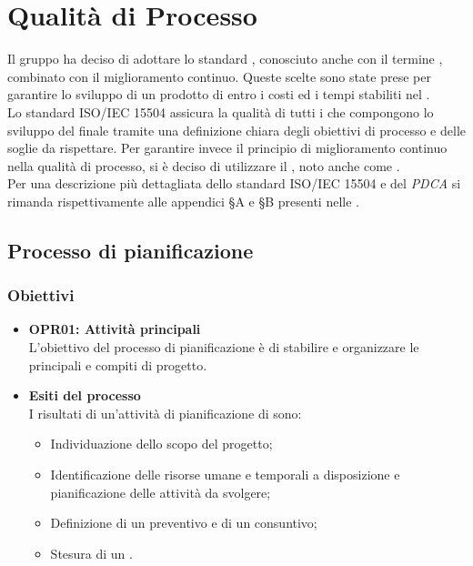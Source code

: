 \section{Qualità di Processo}
\label{qualità_processo}
Il gruppo {\Gruppo} ha deciso di adottare lo standard , conosciuto anche con il termine , combinato con il miglioramento continuo. Queste scelte sono state prese per garantire lo sviluppo di un prodotto di  entro i costi ed i tempi stabiliti nel \textit{\PdP}. \\
Lo standard ISO/IEC 15504 assicura la qualità di tutti i  che compongono lo sviluppo del  finale tramite una definizione chiara degli obiettivi di processo e delle soglie da rispettare. Per garantire invece il principio di miglioramento continuo nella qualità di processo, si è deciso di utilizzare il , noto anche come . \\
Per una descrizione più dettagliata dello standard ISO/IEC 15504 e del \textit{PDCA} si rimanda rispettivamente alle appendici \S{A} e \S{B} presenti nelle \textit{}.

\subsection{Processo di pianificazione}

\subsubsection{Obiettivi}
\begin{itemize}
	\item \textbf{OPR01: Attività principali}\\
	L'obiettivo del processo di pianificazione è di stabilire e organizzare le principali  e compiti di progetto.
	\item \textbf{Esiti del processo}\\
	I risultati di un'attività di pianificazione di  sono:
	\begin{itemize}
		\item Individuazione dello scopo del progetto;
		\item Identificazione delle risorse umane e temporali a disposizione e pianificazione delle attività da svolgere;
		\item Definizione di un preventivo e di un consuntivo;
		\item Stesura di un \textit{\PdP}.
	\end{itemize}
\end{itemize}

